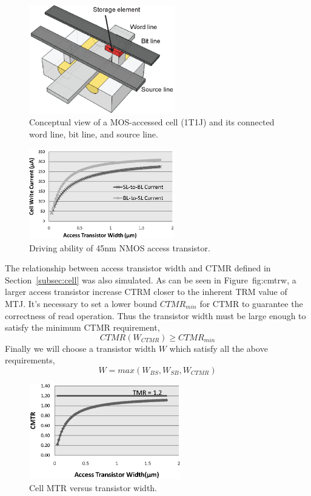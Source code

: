 \begin{figure}[t]
  \centering
  \includegraphics[width=2.5in]{fig/1t1r.eps}
  \caption{Conceptual view of a MOS-accessed cell (1T1J) and its connected word line, bit line, and source line.}
  \label{fig:1t1r}
\end{figure}
\begin{figure}[t]
  \centering
  \includegraphics[width=2.5in]{fig/IC_W.eps}
  \caption{Driving ability of 45nm NMOS access transistor.}
  \label{fig:icw}
\end{figure}

The relationship between access transistor width and CTMR defined in Section~\ref{subsec:cell} was also simulated. As can be seen in Figure~{fig:cmtrw}, a larger access transistor increase CTRM closer to the inherent TRM value of MTJ. It's necessary to set a lower bound $CTMR_{min}$ for CTMR to guarantee the correctness of read operation. Thus the transistor width must be large enough to satisfy the minimum CTMR requirement,
\begin{equation}
CTMR(W_{CTMR}) \geq CTMR_{min}
\end{equation}
Finally we will choose a transistor width $W$ which satisfy all the above requirements,
\begin{equation}
W = max(W_{BS}, W_{SB}, W_{CTMR}) \label{equ:width}
\end{equation}

\begin{figure}[t]
  \centering
  \includegraphics[width=2.6in]{fig/CMTR_W.eps}
  \caption{Cell MTR versus transistor width.}
  \label{fig:cmtrw}
\end{figure}

